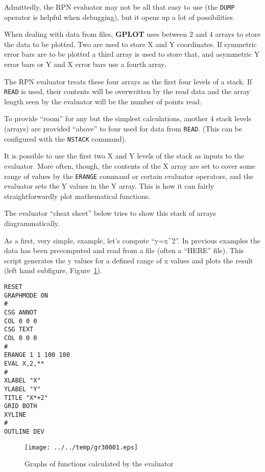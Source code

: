 \documentclass[a4paper,twoside,11pt]{article}
\makeatletter
\def\maxwidth{%
  \ifdim\Gin@nat@width>\linewidth
    \linewidth
  \else
    \Gin@nat@width
  \fi
}
\newcommand{\newpara}{\par\vspace{4mm}\noindent}
\makeatother
\begin{document}
\newpara
Admittedly, the RPN evaluator may not be all that easy to use (the
\texttt{DUMP} operator is helpful when debugging), but it opens up a lot
of possibilities.

\newpara
When dealing with data from files, \textbf{GPLOT} uses between 2 and 4 arrays to
store the data to be plotted. Two are used to store X and Y coordinates.
If symmetric error bars are to be plotted a third array is used to store
that, and asymmetric Y error bars or Y and X error bars use a fourth
array.

\newpara
The RPN evaluator treats these four arrays as the first four levels of a
stack. If \texttt{READ} is used, their contents will be overwritten by
the read data and the array length seen by the evaluator will be the
number of points read.

\newpara
To provide ``room'' for any but the simplest calculations, another 4
stack levels (arrays) are provided ``above'' to four used for data from
\texttt{READ}. (This can be configured with the \texttt{NSTACK}
command).

\newpara
It is possible to use the first two X and Y levels of the stack as
inputs to the evaluator. More often, though, the contents of the X array
are set to cover some range of values by the \texttt{ERANGE} command or
certain evaluator operators, and the evaluator sets the Y values in the
Y array. This is how it can fairly straightforwardly plot mathematical
functions.

\newpara
The evaluator ``cheat sheet'' below tries to show this stack of arrays
diagrammatically.

\newpara
As a first, very simple, example, let's compute ``y=x\^{}2''. In
previous examples the data has been precomputed and read from a file
(often a ``HERE'' file). This script generates the y values for a
defined range of x values and plots the result (left hand subfigure,
Figure~\ref{fig:gr30001}).

\begin{lstlisting}
RESET
GRAPHMODE ON
#
CSG ANNOT
COL 0 0 0
CSG TEXT
COL 0 0 0
#
ERANGE 1 1 100 100
EVAL X,2,**
#
XLABEL "X"
YLABEL "Y"
TITLE "X*+2"
GRID BOTH
XYLINE
#
OUTLINE DEV
\end{lstlisting}

\begin{figure}
  \centering
  \texttt{[image: ../../temp/gr30001.eps]}
  \caption{Graphs of functions calculated by the evaluator}
  \label{fig:gr30001}
\end{figure}
\end{document}
